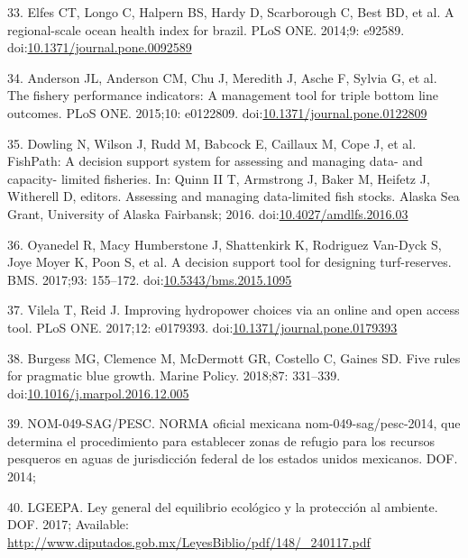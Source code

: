 \documentclass[12pt,]{article}
\begin{document}
\hypertarget{ref-elfes_2014-RC}{}
33. Elfes CT, Longo C, Halpern BS, Hardy D, Scarborough C, Best BD, et
al. A regional-scale ocean health index for brazil. PLoS ONE. 2014;9:
e92589.
doi:\href{https://doi.org/10.1371/journal.pone.0092589}{10.1371/journal.pone.0092589}

\hypertarget{ref-anderson_2015-ND}{}
34. Anderson JL, Anderson CM, Chu J, Meredith J, Asche F, Sylvia G, et
al. The fishery performance indicators: A management tool for triple
bottom line outcomes. PLoS ONE. 2015;10: e0122809.
doi:\href{https://doi.org/10.1371/journal.pone.0122809}{10.1371/journal.pone.0122809}

\hypertarget{ref-dowling_2016-pO}{}
35. Dowling N, Wilson J, Rudd M, Babcock E, Caillaux M, Cope J, et al.
FishPath: A decision support system for assessing and managing data- and
capacity- limited fisheries. In: Quinn II T, Armstrong J, Baker M,
Heifetz J, Witherell D, editors. Assessing and managing data-limited
fish stocks. Alaska Sea Grant, University of Alaska Fairbansk; 2016.
doi:\href{https://doi.org/10.4027/amdlfs.2016.03}{10.4027/amdlfs.2016.03}

\hypertarget{ref-oyanedel_2017-TO}{}
36. Oyanedel R, Macy Humberstone J, Shattenkirk K, Rodriguez Van-Dyck S,
Joye Moyer K, Poon S, et al. A decision support tool for designing
turf-reserves. BMS. 2017;93: 155--172.
doi:\href{https://doi.org/10.5343/bms.2015.1095}{10.5343/bms.2015.1095}

\hypertarget{ref-vilela_2017-Zo}{}
37. Vilela T, Reid J. Improving hydropower choices via an online and
open access tool. PLoS ONE. 2017;12: e0179393.
doi:\href{https://doi.org/10.1371/journal.pone.0179393}{10.1371/journal.pone.0179393}

\hypertarget{ref-burgess_2018-HN}{}
38. Burgess MG, Clemence M, McDermott GR, Costello C, Gaines SD. Five
rules for pragmatic blue growth. Marine Policy. 2018;87: 331--339.
doi:\href{https://doi.org/10.1016/j.marpol.2016.12.005}{10.1016/j.marpol.2016.12.005}

\hypertarget{ref-nom049sagpesc_2014-V6}{}
39. NOM-049-SAG/PESC. NORMA oficial mexicana nom-049-sag/pesc-2014, que
determina el procedimiento para establecer zonas de refugio para los
recursos pesqueros en aguas de jurisdicción federal de los estados
unidos mexicanos. DOF. 2014;

\hypertarget{ref-lgeepa_2017-jL}{}
40. LGEEPA. Ley general del equilibrio ecológico y la protección al
ambiente. DOF. 2017; Available:
\url{http://www.diputados.gob.mx/LeyesBiblio/pdf/148/_240117.pdf}
\end{document}
